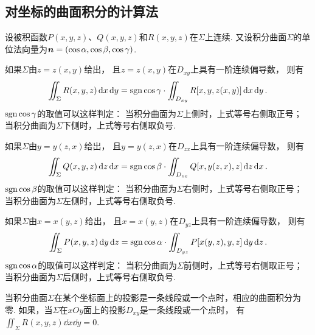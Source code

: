 \subsection{对坐标的曲面积分的计算法}
\begin{theorem}
设被积函数\(P(x,y,z)\)、\(Q(x,y,z)\)和\(R(x,y,z)\)在\(\Sigma\)上连续.
又设积分曲面\(\Sigma\)的单位法向量为\(\boldsymbol{n} = (\cos\alpha,\cos\beta,\cos\gamma)\).

如果\(\Sigma\)由\(z=z(x,y)\)给出，
且\(z=z(x,y)\)在\(D_{xy}\)上具有一阶连续偏导数，
则有\begin{equation}\label{equation:线积分与面积分.第二类曲面积分的计算式1}
	\iint_\Sigma R(x,y,z) \dd{x}\dd{y}
	= \operatorname{sgn}\cos\gamma \cdot \iint_{D_{xy}} R[x,y,z(x,y)] \dd{x}\dd{y}.
\end{equation}
\(\operatorname{sgn}\cos\gamma\)的取值可以这样判定：
当积分曲面为\(\Sigma\)上侧时，上式等号右侧取正号；
当积分曲面为\(\Sigma\)下侧时，上式等号右侧取负号.

如果\(\Sigma\)由\(y=y(z,x)\)给出，
且\(y=y(z,x)\)在\(D_{zx}\)上具有一阶连续偏导数，
则有\begin{equation}\label{equation:线积分与面积分.第二类曲面积分的计算式2}
	\iint_\Sigma Q(x,y,z) \dd{z}\dd{x}
	= \operatorname{sgn}\cos\beta \cdot \iint_{D_{zx}} Q[x,y(z,x),z] \dd{z}\dd{x}.
\end{equation}
\(\operatorname{sgn}\cos\beta\)的取值可以这样判定：
当积分曲面为\(\Sigma\)右侧时，上式等号右侧取正号；
当积分曲面为\(\Sigma\)左侧时，上式等号右侧取负号.

如果\(\Sigma\)由\(x=x(y,z)\)给出，
且\(x=x(y,z)\)在\(D_{yz}\)上具有一阶连续偏导数，
则有\begin{equation}\label{equation:线积分与面积分.第二类曲面积分的计算式3}
	\iint_\Sigma P(x,y,z) \dd{y}\dd{z}
	= \operatorname{sgn}\cos\alpha \cdot \iint_{D_{yz}} P[x(y,z),y,z] \dd{y}\dd{z}.
\end{equation}
\(\operatorname{sgn}\cos\alpha\)的取值可以这样判定：
当积分曲面为\(\Sigma\)前侧时，上式等号右侧取正号；
当积分曲面为\(\Sigma\)后侧时，上式等号右侧取负号.
\end{theorem}
\begin{remark}
当积分曲面\(\Sigma\)在某个坐标面上的投影是一条线段或一个点时，相应的曲面积分为零.
如果，当\(\Sigma\)在\(xOy\)面上的投影\(D_{xy}\)是一条线段或一个点时，
有\(\iint_\Sigma R(x,y,z) \dd{x}\dd{y} = 0\).
\end{remark}

